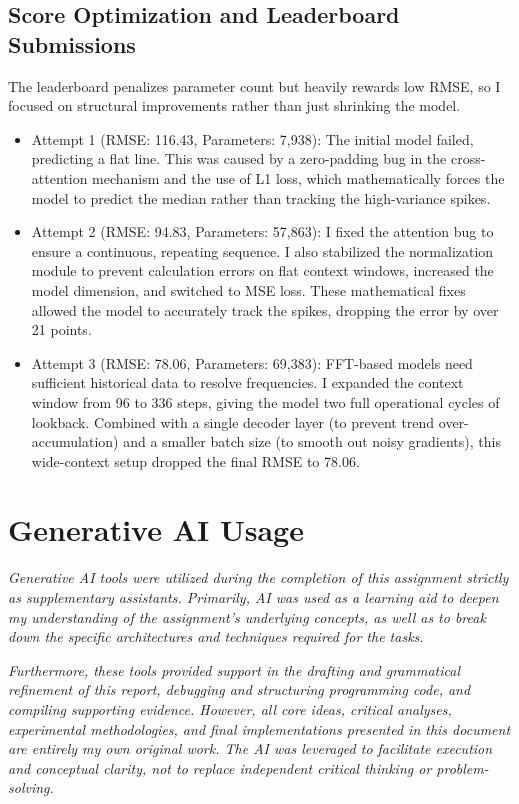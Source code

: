 \documentclass[11pt, a4paper]{article}
\begin{document}
\subsection*{Score Optimization and Leaderboard Submissions}

The leaderboard penalizes parameter count but heavily rewards low RMSE, so I focused on structural improvements rather than just shrinking the model.

\begin{itemize}
  \item Attempt 1 (RMSE: 116.43, Parameters: 7,938): The initial model failed, predicting a flat line. This was caused by a zero-padding bug in the cross-attention mechanism and the use of L1 loss, which mathematically forces the model to predict the median rather than tracking the high-variance spikes.
  \item Attempt 2 (RMSE: 94.83, Parameters: 57,863): I fixed the attention bug to ensure a continuous, repeating sequence. I also stabilized the normalization module to prevent calculation errors on flat context windows, increased the model dimension, and switched to MSE loss. These mathematical fixes allowed the model to accurately track the spikes, dropping the error by over 21 points.
  \item Attempt 3 (RMSE: 78.06, Parameters: 69,383): FFT-based models need sufficient historical data to resolve frequencies. I expanded the context window from 96 to 336 steps, giving the model two full operational cycles of lookback. Combined with a single decoder layer (to prevent trend over-accumulation) and a smaller batch size (to smooth out noisy gradients), this wide-context setup dropped the final RMSE to 78.06.
\end{itemize}

\section*{Generative AI Usage}

\textit{Generative AI tools were utilized during the completion of this assignment strictly as supplementary assistants. Primarily, AI was used as a learning aid to deepen my understanding of the assignment's underlying concepts, as well as to break down the specific architectures and techniques required for the tasks.} 

\textit{Furthermore, these tools provided support in the drafting and grammatical refinement of this report, debugging and structuring programming code, and compiling supporting evidence. However, all core ideas, critical analyses, experimental methodologies, and final implementations presented in this document are entirely my own original work. The AI was leveraged to facilitate execution and conceptual clarity, not to replace independent critical thinking or problem-solving.}
\end{document}
